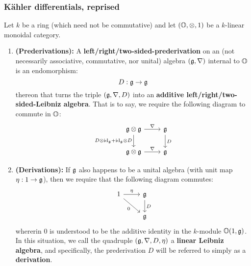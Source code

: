             \subsubsection{K\"ahler differentials, reprised} \label{subsubsection: kahler_differentials}
                \begin{definition} \label{def: derivations}
                    Let $k$ be a ring (which need not be commutative) and let $(\O, \tensor, 1)$ be a $k$-linear monoidal category. 
                        \begin{enumerate}
                            \item \textbf{(Prederivations):} A \textbf{left/right/two-sided-prederivation} on an (not necessarily associative, commutative, nor unital) algebra $\left(\mathfrak{g}, \nabla\right)$ internal to $\mathbb{O}$ is an endomorphism:
                                $$D: \mathfrak{g} \to \mathfrak{g}$$
                            thereon that turns the triple $\left(\mathfrak{g}, \nabla, D\right)$ into an \textbf{additive left/right/two-sided-Leibniz algebra}. That is to say, we require the following diagram to commute in $\mathbb{O}$:
                                $$
                                    \begin{tikzcd}
                                    	{\g \tensor \g} & {\g} \\
                                    	{\g \tensor \g} & {\g}
                                    	\arrow["{D}", from=1-2, to=2-2]
                                    	\arrow["{\nabla}", from=2-1, to=2-2]
                                    	\arrow["{\nabla}", from=1-1, to=1-2]
                                    	\arrow["{D \tensor \id_{\g} + \id_{\g} \tensor D}"', from=1-1, to=2-1]
                                    \end{tikzcd}
                                $$
                            \item \textbf{(Derivations):} If $\mathfrak{g}$ also happens to be a unital algebra (with unit map $\eta: 1 \to \mathfrak{g}$), then we require that the following diagram commutes:
                                $$
                                    \begin{tikzcd}
                                    	{1} & {\g} \\
                                    	& {\g}
                                    	\arrow["{D}", from=1-2, to=2-2]
                                    	\arrow["{\eta}", from=1-1, to=1-2]
                                    	\arrow["{0}"', from=1-1, to=2-2]
                                    \end{tikzcd}
                                $$
                            whererin $0$ is understood to be the additive identity in the $k$-module $\mathbb{O}(1, \mathfrak{g})$. In this situation, we call the quadruple $(\mathfrak{g}, \nabla, D, \eta)$ a \textbf{linear Leibniz algebra}, and specifically, the prederivation $D$ will be referred to simply as a \textbf{derivation}.
                        \end{enumerate}
                \end{definition}
